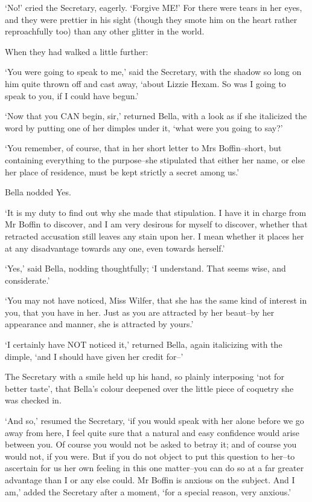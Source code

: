 ‘No!’ cried the Secretary, eagerly. ‘Forgive ME!’ For there were tears
in her eyes, and they were prettier in his sight (though they smote him
on the heart rather reproachfully too) than any other glitter in the
world.

When they had walked a little further:

‘You were going to speak to me,’ said the Secretary, with the shadow so
long on him quite thrown off and cast away, ‘about Lizzie Hexam. So was
I going to speak to you, if I could have begun.’

‘Now that you CAN begin, sir,’ returned Bella, with a look as if she
italicized the word by putting one of her dimples under it, ‘what were
you going to say?’

‘You remember, of course, that in her short letter to Mrs Boffin--short,
but containing everything to the purpose--she stipulated that either
her name, or else her place of residence, must be kept strictly a secret
among us.’

Bella nodded Yes.

‘It is my duty to find out why she made that stipulation. I have it in
charge from Mr Boffin to discover, and I am very desirous for myself to
discover, whether that retracted accusation still leaves any stain upon
her. I mean whether it places her at any disadvantage towards any one,
even towards herself.’

‘Yes,’ said Bella, nodding thoughtfully; ‘I understand. That seems wise,
and considerate.’

‘You may not have noticed, Miss Wilfer, that she has the same kind of
interest in you, that you have in her. Just as you are attracted by her
beaut--by her appearance and manner, she is attracted by yours.’

‘I certainly have NOT noticed it,’ returned Bella, again italicizing
with the dimple, ‘and I should have given her credit for--’

The Secretary with a smile held up his hand, so plainly interposing ‘not
for better taste’, that Bella’s colour deepened over the little piece of
coquetry she was checked in.

‘And so,’ resumed the Secretary, ‘if you would speak with her alone
before we go away from here, I feel quite sure that a natural and easy
confidence would arise between you. Of course you would not be asked to
betray it; and of course you would not, if you were. But if you do not
object to put this question to her--to ascertain for us her own feeling
in this one matter--you can do so at a far greater advantage than I or
any else could. Mr Boffin is anxious on the subject. And I am,’ added
the Secretary after a moment, ‘for a special reason, very anxious.’


